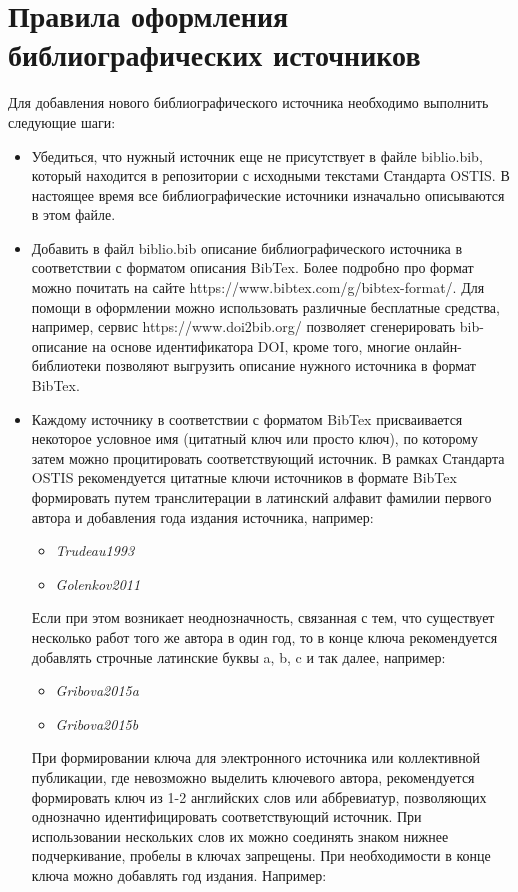 
\section*{Правила оформления библиографических источников}

Для добавления нового библиографического источника необходимо выполнить следующие шаги:
\begin{itemize}
	\item Убедиться, что нужный источник еще не присутствует в файле biblio.bib, который находится в репозитории с исходными текстами Стандарта OSTIS. В настоящее время все библиографические источники изначально описываются в этом файле.
	\item Добавить в файл biblio.bib описание библиографического источника в соответствии с форматом описания BibTex. Более подробно про формат можно почитать на сайте https://www.bibtex.com/g/bibtex-format/. Для помощи в оформлении можно использовать различные бесплатные средства, например, сервис https://www.doi2bib.org/ позволяет сгенерировать bib-описание на основе идентификатора DOI, кроме того, многие онлайн-библиотеки позволяют выгрузить описание нужного источника в формат BibTex.
	\item Каждому источнику в соответствии с форматом BibTex присваивается некоторое условное имя (цитатный ключ или просто ключ), по которому затем можно процитировать соответствующий источник. В рамках Стандарта OSTIS рекомендуется цитатные ключи источников в формате BibTex формировать путем транслитерации в латинский алфавит фамилии первого автора и добавления года издания источника, например:
	
	\begin{itemize}
		\item \textit{Trudeau1993}
		\item \textit{Golenkov2011}
	\end{itemize}
	
	Если при этом возникает неоднозначность, связанная с тем, что существует несколько работ того же автора в один год, то в конце ключа рекомендуется добавлять строчные латинские буквы a, b, c и так далее, например:
	
	\begin{itemize}
		\item \textit{Gribova2015a}
		\item \textit{Gribova2015b}
	\end{itemize}
	
	При формировании ключа для электронного источника или коллективной публикации, где невозможно выделить ключевого автора, рекомендуется формировать ключ из 1-2 английских слов или аббревиатур, позволяющих однозначно идентифицировать соответствующий источник. При использовании нескольких слов их можно соединять знаком нижнее подчеркивание, пробелы в ключах запрещены. При необходимости в конце ключа можно добавлять год издания. Например:
	

\end{itemize}
